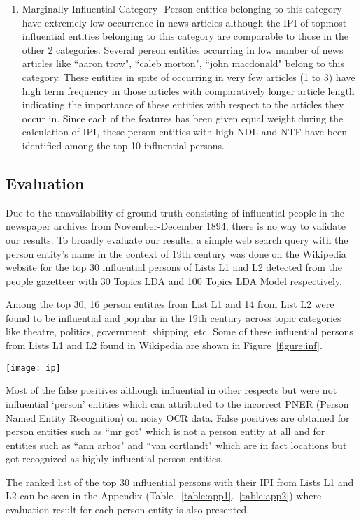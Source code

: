 \begin{enumerate}
\item
Marginally Influential Category- Person entities belonging to this category have extremely low occurrence in news articles although the IPI of topmost influential entities belonging to this category are comparable to those in the other 2 categories.
Several person entities occurring in low number of news articles like ``aaron trow", ``caleb morton", ``john macdonald"  belong to this category. These entities in spite of occurring in very few articles (1 to 3) have high term frequency in those articles with comparatively longer article length indicating the importance of these entities with respect to the articles they occur in. Since each of the features has been given equal weight during the calculation of IPI,  these person entities with high NDL and NTF have been identified among the top 10 influential persons. 
 

\end{enumerate} 


\subsection{Evaluation}

Due to the unavailability of ground truth consisting of influential people in the newspaper archives from November-December 1894, there is no way to validate our results. 
To broadly evaluate our results, a simple web search query with the person entity's name in the context of 19th century was done on the Wikipedia website for the top 30 influential persons of Lists L1 and L2 detected from the people gazetteer with 30 Topics LDA and 100 Topics LDA Model respectively.

Among the top 30, 16 person entities from List L1 and 14 from List L2 were found to be influential and popular in the 19th century across topic categories like theatre, politics, government, shipping, etc. Some of these influential persons from Lists L1 and L2 found in Wikipedia are shown in Figure~\ref{figure:inf}. 

\begin{figure*}
\begin{center}
\texttt{[image: ip]}
\caption{Some of the top 30 influential persons obtained from the dataset and also found on Wikipedia during evaluation}
\label{figure:inf}
\end{center}
\end{figure*}


 Most of the false positives although influential in other respects but were not  influential `person' entities which can attributed to the incorrect PNER (Person Named Entity Recognition) on noisy OCR data.
 False positives are obtained for person entities  such as ``mr got" which is not a person entity at all and for entities such as ``ann arbor" and ``van cortlandt" which are in fact locations but got recognized as highly influential person entities.
 
 The ranked list of the top 30 influential persons with their IPI from Lists L1 and L2 can be seen in the Appendix (Table ~\ref{table:app1}.~\ref{table:app2}) where evaluation result for each person entity is also presented.
